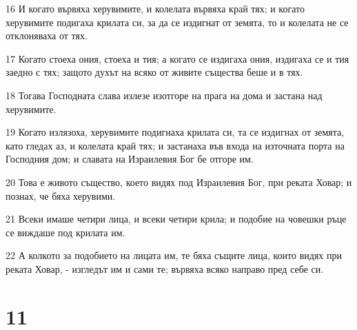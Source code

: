 \par 16 И когато вървяха херувимите, и колелата вървяха край тях; и когато херувимите подигаха крилата си, за да се издигнат от земята, то и колелата не се отклоняваха от тях.
\par 17 Когато стоеха ония, стоеха и тия; а когато се издигаха ония, издигаха се и тия заедно с тях; защото духът на всяко от живите същества беше и в тях.
\par 18 Тогава Господната слава излезе изотгоре на прага на дома и застана над херувимите.
\par 19 Когато излязоха, херувимите подигнаха крилата си, та се издигнах от земята, като гледах аз, и колелата край тях; и застанаха във входа на източната порта на Господния дом; и славата на Израилевия Бог бе отгоре им.
\par 20 Това е живото същество, което видях под Израилевия Бог, при реката Ховар; и познах, че бяха херувими.
\par 21 Всеки имаше четири лица, и всеки четири крила; и подобие на човешки ръце се виждаше под крилата им.
\par 22 А колкото за подобието на лицата им, те бяха същите лица, които видях при реката Ховар, - изгледът им и сами те; вървяха всяко направо пред себе си.

\chapter{11}

